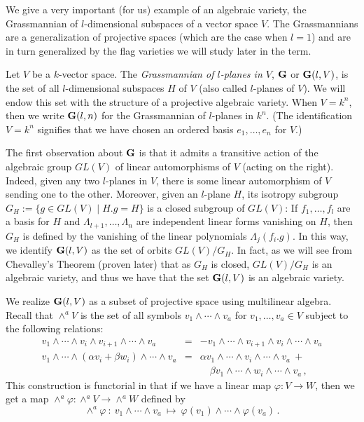\documentclass[12pt]{amsart}
\newcommand{\G}{{\bf G}}
\begin{document}
We give a very important (for us) example of an algebraic variety,
the Grassmannian of $l$-dimensional subspaces of a vector space $V$.
The Grassmannians are a generalization of projective spaces
(which are the case when $l=1$) and are in turn generalized by the flag
varieties we will  study later in the term.


Let $V$ be a $k$-vector space.
The {\sl Grassmannian of $l$-planes in $V$}, $\G$ or $\G(l,V)$, is the set
of all $l$-dimensional subspaces $H$ of $V$ (also called $l$-planes of $V$).
We will endow this set with the structure of a projective
algebraic variety.
When $V=k^n$, then we write $\G(l,n)$ for the Grassmannian of $l$-planes 
in $k^n$.
(The identification $V=k^n$ signifies that we have chosen an ordered basis
$e_1,\ldots,e_n$ for $V$.)


The first observation about $\G$ is that it admits a transitive action of
the algebraic group $GL(V)$ of linear automorphisms of $V$ (acting on the
right).
Indeed, given any two $l$-planes in $V$, there is some linear automorphism
of $V$ sending one to the other.
Moreover, given an $l$-plane $H$, its isotropy subgroup 
$G_H:=\{g\in GL(V)\mid H.g=H\}$ is a closed subgroup of $GL(V)$:
If $f_1,\ldots,f_l$ are a basis for $H$ and $\Lambda_{l+1},\ldots,\Lambda_n$
are independent linear forms vanishing on $H$, then $G_H$ is defined by the
vanishing of the linear polynomials $\Lambda_j(f_i.g)$.
In this way, we identify $\G(l,V)$ as the set of orbits 
$GL(V)/G_H$.
In fact, as we will see from Chevalley's Theorem (proven later) that as
$G_H$ is closed, $GL(V)/G_H$ is an algebraic variety, and thus we have that
the set $\G(l,V)$ is an algebraic variety.

We realize $\G(l,V)$ as a subset of projective space using multilinear
algebra.
Recall that $\wedge^aV$ is the set of all symbols 
$v_1\wedge\cdots\wedge v_a$ for $v_1,\ldots,v_a\in V$ subject to the
following relations:
%
\begin{eqnarray*}
   v_1\wedge\cdots\wedge v_i\wedge v_{i+1}\wedge\cdots\wedge v_a &=&
  -v_1\wedge\cdots\wedge v_{i+1}\wedge v_i\wedge\cdots\wedge v_a\\
   v_1\wedge\cdots\wedge (\alpha v_i+ \beta w_i)\wedge\cdots\wedge v_a &=&
   \alpha v_1\wedge\cdots\wedge v_i\wedge\cdots\wedge v_a\  +\\
    &&\quad
   \beta v_1\wedge\cdots\wedge  w_i\wedge\cdots\wedge v_a\,,
\end{eqnarray*}
%
This construction is functorial in that if we have a linear map 
$\varphi\colon V\to W$, then we get a map 
$\wedge^a\varphi\colon\wedge^aV\to\wedge^aW$ defined by
$$  
  \wedge^a\varphi\ :\ 
   v_1\wedge\cdots\wedge v_a\ \longmapsto\ 
   \varphi(v_1)\wedge\cdots\wedge \varphi(v_a)\,.
$$
\end{document}
